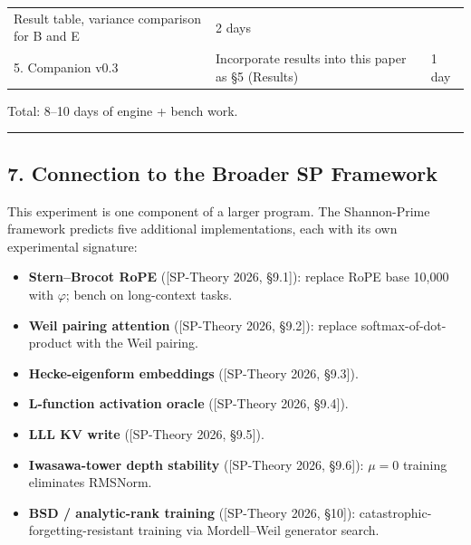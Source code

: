 \documentclass[
  11pt,
]{article}
\providecommand{\tightlist}{%
  \setlength{\itemsep}{0pt}\setlength{\parskip}{0pt}}
\begin{document}
\begin{longtable}[]{@{}lll@{}}
\begin{minipage}[t]{0.30\columnwidth}
Result table, variance comparison for B and E\strut
\end{minipage} & \begin{minipage}[t]{0.30\columnwidth}\raggedright
2 days\strut
\end{minipage}\tabularnewline
\begin{minipage}[t]{0.30\columnwidth}\raggedright
5. Companion v0.3\strut
\end{minipage} & \begin{minipage}[t]{0.30\columnwidth}\raggedright
Incorporate results into this paper as §5 (Results)\strut
\end{minipage} & \begin{minipage}[t]{0.30\columnwidth}\raggedright
1 day\strut
\end{minipage}\tabularnewline
\bottomrule
\end{longtable}

Total: 8--10 days of engine + bench work.

\begin{center}\rule{0.5\linewidth}{0.5pt}\end{center}

\hypertarget{connection-to-the-broader-sp-framework}{%
\subsection{7. Connection to the Broader SP
Framework}\label{connection-to-the-broader-sp-framework}}

This experiment is one component of a larger program. The Shannon-Prime
framework predicts five additional implementations, each with its own
experimental signature:

\begin{itemize}
\tightlist
\item
  \textbf{Stern--Brocot RoPE} ({[}SP-Theory 2026, §9.1{]}): replace RoPE
  base 10,000 with \(\varphi\); bench on long-context tasks.
\item
  \textbf{Weil pairing attention} ({[}SP-Theory 2026, §9.2{]}): replace
  softmax-of-dot-product with the Weil pairing.
\item
  \textbf{Hecke-eigenform embeddings} ({[}SP-Theory 2026, §9.3{]}).
\item
  \textbf{L-function activation oracle} ({[}SP-Theory 2026, §9.4{]}).
\item
  \textbf{LLL KV write} ({[}SP-Theory 2026, §9.5{]}).
\item
  \textbf{Iwasawa-tower depth stability} ({[}SP-Theory 2026, §9.6{]}):
  \(\mu = 0\) training eliminates RMSNorm.
\item
  \textbf{BSD / analytic-rank training} ({[}SP-Theory 2026, §10{]}):
  catastrophic-forgetting-resistant training via Mordell--Weil generator
  search.
\end{itemize}
\end{document}
